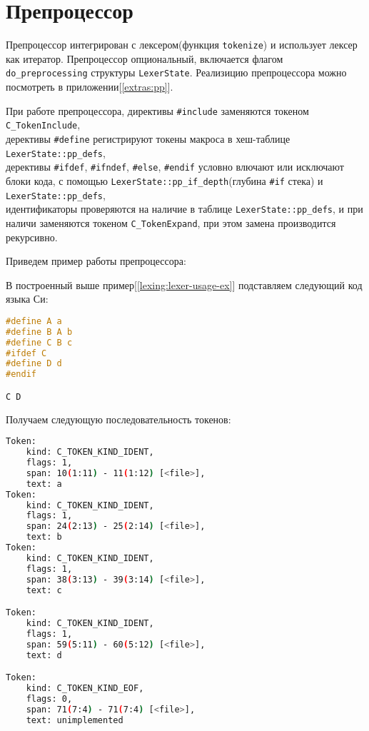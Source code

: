 \clearpage
\section{Препроцессор}
\label{pass:pp}

Препроцессор интегрирован с лексером(функция \verb|tokenize|) и использует лексер как итератор.
Препроцессор опциональный, включается флагом \verb|do_preprocessing| структуры \verb|LexerState|.
Реализицию препроцессора можно посмотреть в приложении[\ref{extras:pp}].

При работе препроцессора, директивы \verb|#include| заменяются токеном \verb|C_TokenInclude|, \\
дерективы \verb|#define| регистрируют токены макроса в хеш-таблице \newline\verb|LexerState::pp_defs|, \\
дерективы \verb|#ifdef|, \verb|#ifndef|, \verb|#else|, \verb|#endif| условно влючают или исключают блоки кода, 
с помощью \verb|LexerState::pp_if_depth|(глубина \verb|#if| стека) и \verb|LexerState::pp_defs|, \\
идентификаторы проверяются на наличие в таблице \verb|LexerState::pp_defs|, и при наличи заменяются токеном \verb|C_TokenExpand|,
при этом замена производится рекурсивно.

Приведем пример работы препроцессора:

В построенный выше пример[\ref{lexing:lexer-usage-ex}] подставляем следующий код языка Си:
\begin{lstlisting}[language=c, caption={Входные данные примера}, label={lexing:pp:ex-in}]
#define A a
#define B A b
#define C B c
#ifdef C
#define D d
#endif

C D
\end{lstlisting}

Получаем следующую последовательность токенов:
\begin{lstlisting}[language=bash, caption={Выходные данные примера}, label={lexing:pp:ex-out}]
Token:
    kind: C_TOKEN_KIND_IDENT,
    flags: 1,
    span: 10(1:11) - 11(1:12) [<file>],
    text: a
Token:
    kind: C_TOKEN_KIND_IDENT,
    flags: 1,
    span: 24(2:13) - 25(2:14) [<file>],
    text: b
Token:
    kind: C_TOKEN_KIND_IDENT,
    flags: 1,
    span: 38(3:13) - 39(3:14) [<file>],
    text: c

Token:
    kind: C_TOKEN_KIND_IDENT,
    flags: 1,
    span: 59(5:11) - 60(5:12) [<file>],
    text: d

Token:
    kind: C_TOKEN_KIND_EOF,
    flags: 0,
    span: 71(7:4) - 71(7:4) [<file>],
    text: unimplemented
\end{lstlisting}

